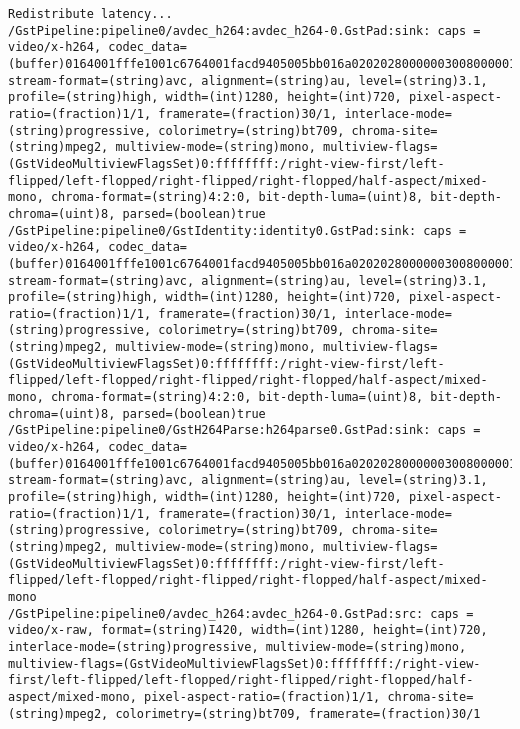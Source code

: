 \documentclass[12pt,oneside]{book}
\begin{document}
\begin{lstlisting}
Redistribute latency...
/GstPipeline:pipeline0/avdec_h264:avdec_h264-0.GstPad:sink: caps = video/x-h264, codec_data=(buffer)0164001fffe1001c6764001facd9405005bb016a02020280000003008000001e478c18cb01000568ebecb22c, stream-format=(string)avc, alignment=(string)au, level=(string)3.1, profile=(string)high, width=(int)1280, height=(int)720, pixel-aspect-ratio=(fraction)1/1, framerate=(fraction)30/1, interlace-mode=(string)progressive, colorimetry=(string)bt709, chroma-site=(string)mpeg2, multiview-mode=(string)mono, multiview-flags=(GstVideoMultiviewFlagsSet)0:ffffffff:/right-view-first/left-flipped/left-flopped/right-flipped/right-flopped/half-aspect/mixed-mono, chroma-format=(string)4:2:0, bit-depth-luma=(uint)8, bit-depth-chroma=(uint)8, parsed=(boolean)true
/GstPipeline:pipeline0/GstIdentity:identity0.GstPad:sink: caps = video/x-h264, codec_data=(buffer)0164001fffe1001c6764001facd9405005bb016a02020280000003008000001e478c18cb01000568ebecb22c, stream-format=(string)avc, alignment=(string)au, level=(string)3.1, profile=(string)high, width=(int)1280, height=(int)720, pixel-aspect-ratio=(fraction)1/1, framerate=(fraction)30/1, interlace-mode=(string)progressive, colorimetry=(string)bt709, chroma-site=(string)mpeg2, multiview-mode=(string)mono, multiview-flags=(GstVideoMultiviewFlagsSet)0:ffffffff:/right-view-first/left-flipped/left-flopped/right-flipped/right-flopped/half-aspect/mixed-mono, chroma-format=(string)4:2:0, bit-depth-luma=(uint)8, bit-depth-chroma=(uint)8, parsed=(boolean)true
/GstPipeline:pipeline0/GstH264Parse:h264parse0.GstPad:sink: caps = video/x-h264, codec_data=(buffer)0164001fffe1001c6764001facd9405005bb016a02020280000003008000001e478c18cb01000568ebecb22c, stream-format=(string)avc, alignment=(string)au, level=(string)3.1, profile=(string)high, width=(int)1280, height=(int)720, pixel-aspect-ratio=(fraction)1/1, framerate=(fraction)30/1, interlace-mode=(string)progressive, colorimetry=(string)bt709, chroma-site=(string)mpeg2, multiview-mode=(string)mono, multiview-flags=(GstVideoMultiviewFlagsSet)0:ffffffff:/right-view-first/left-flipped/left-flopped/right-flipped/right-flopped/half-aspect/mixed-mono
/GstPipeline:pipeline0/avdec_h264:avdec_h264-0.GstPad:src: caps = video/x-raw, format=(string)I420, width=(int)1280, height=(int)720, interlace-mode=(string)progressive, multiview-mode=(string)mono, multiview-flags=(GstVideoMultiviewFlagsSet)0:ffffffff:/right-view-first/left-flipped/left-flopped/right-flipped/right-flopped/half-aspect/mixed-mono, pixel-aspect-ratio=(fraction)1/1, chroma-site=(string)mpeg2, colorimetry=(string)bt709, framerate=(fraction)30/1

\end{lstlisting}
\end{document}
